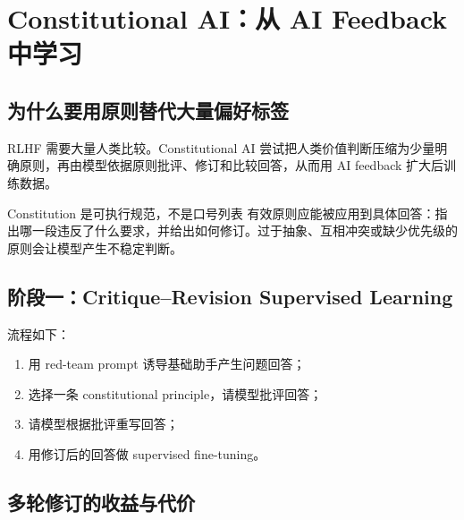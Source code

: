 \section{Constitutional AI：从 AI Feedback 中学习}

\subsection{为什么要用原则替代大量偏好标签}

RLHF 需要大量人类比较。Constitutional AI 尝试把人类价值判断压缩为少量明确原则，再由模型依据原则批评、修订和比较回答，从而用 AI feedback 扩大后训练数据。


\begin{knowledgebox}{Constitution 是可执行规范，不是口号列表}
有效原则应能被应用到具体回答：指出哪一段违反了什么要求，并给出如何修订。过于抽象、互相冲突或缺少优先级的原则会让模型产生不稳定判断。
\end{knowledgebox}

\subsection{阶段一：Critique--Revision Supervised Learning}

流程如下：

\begin{enumerate}
    \item 用 red-team prompt 诱导基础助手产生问题回答；
    \item 选择一条 constitutional principle，请模型批评回答；
    \item 请模型根据批评重写回答；
    \item 用修订后的回答做 supervised fine-tuning。
\end{enumerate}




\subsection{多轮修订的收益与代价}

